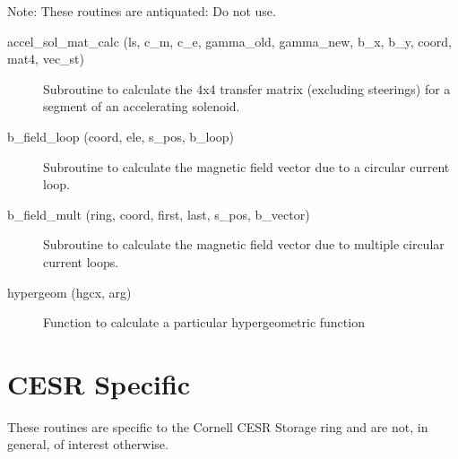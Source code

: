 Note: These routines are antiquated: Do not use.

\begin{description}

\item[accel\_sol\_mat\_calc (ls, c\_m, c\_e, gamma\_old, gamma\_new, 
b\_x, b\_y, coord, mat4, vec\_st)] \Newline
Subroutine to calculate the 4x4 transfer matrix (excluding steerings) for a 
segment of an accelerating solenoid. 

\item[b\_field\_loop (coord, ele, s\_pos, b\_loop)] \Newline
Subroutine to calculate the magnetic field vector due to a 
circular current loop. 

\item[b\_field\_mult (ring, coord, first, last, s\_pos, b\_vector)] \Newline
Subroutine to calculate the magnetic field vector due to multiple 
circular current loops. 

\item[hypergeom (hgcx, arg)] \Newline
Function to calculate a particular hypergeometric function 

\end{description}

%

\section{CESR Specific}
\label{r:cesr}

These routines are specific to the Cornell CESR Storage ring and are
not, in general, of interest otherwise.

